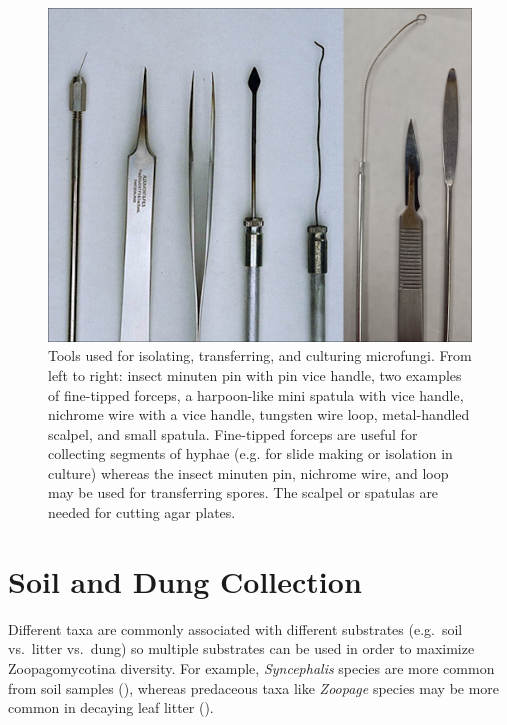 \documentclass[]{book}
\begin{document}
\begin{figure}

{\centering \includegraphics[width=6.83in]{img/Fig1_Ch2} 

}

\caption{ Tools used for isolating, transferring, and culturing microfungi.  From left to right: insect minuten pin with pin vice handle, two examples of fine-tipped forceps, a harpoon-like mini spatula with vice handle, nichrome wire with a vice handle, tungsten wire loop, metal-handled scalpel, and small spatula.  Fine-tipped forceps are useful for collecting segments of hyphae (e.g. for slide making or isolation in culture) whereas the insect minuten pin, nichrome wire, and loop may be used for transferring spores.  The scalpel or spatulas are needed for cutting agar plates.}\label{fig:ch2fig1}
\end{figure}

\section{Soil and Dung Collection}\label{soil-and-dung-collection}

Different taxa are commonly associated with different substrates
(e.g.~soil vs.~litter vs.~dung) so multiple substrates can be used in
order to maximize Zoopagomycotina diversity. For example,
\emph{Syncephalis} species are more common from soil samples
(\citet{Benny_2016}), whereas predaceous taxa like \emph{Zoopage}
species may be more common in decaying leaf litter
(\citet{Duddington_1955}).
\end{document}
